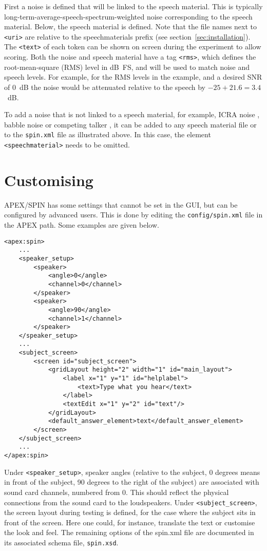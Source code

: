 {First a noise is defined that will be linked to the speech material.
This is typically long-term-average-speech-spectrum-weighted noise
corresponding to the speech material. Below, the speech material is
defined. Note that the file names next to \texttt{<uri>} are relative to
the speechmaterials prefix (see section~\ref{sec:installation}). The
\texttt{<text>} of each token can be shown on screen during the
experiment to allow scoring. Both the noise and speech material have a
tag \texttt{<rms>}, which defines the root-mean-square (RMS) level in
dB~FS, and will be used to match noise and speech levels. For example, for the
RMS levels in the example, and a desired SNR of 0~dB the noise would be
attenuated relative to the speech by $-25+21.6=3.4$~dB.

To add a noise that is not linked to a speech material, for example, ICRA noise
\citep{Dreschler}, babble noise or competing talker \citep{flucnoise},
it can be added to any speech material file or to the \texttt{spin.xml}
file as illustrated above. In this case, the element
\texttt{<speechmaterial>} needs to be omitted.

\section{Customising}
\label{sec:customising}

APEX/SPIN has some settings that cannot be set in the GUI, but can be
configured by advanced users. This is done by editing the
\texttt{config/spin.xml} file in the APEX path. Some examples are given
below.

\begin{lstlisting}[caption=Specifying speaker locations and a custom screen]
<apex:spin>
    ...
    <speaker_setup>
        <speaker> 
            <angle>0</angle>    
            <channel>0</channel>
        </speaker>
        <speaker>
            <angle>90</angle>
            <channel>1</channel>
        </speaker>
    </speaker_setup>
    ...
    <subject_screen>
        <screen id="subject_screen">
            <gridLayout height="2" width="1" id="main_layout">
                <label x="1" y="1" id="helplabel">
                    <text>Type what you hear</text>
                </label>
                <textEdit x="1" y="2" id="text"/>
            </gridLayout>
            <default_answer_element>text</default_answer_element>
        </screen>
    </subject_screen>
    ...
</apex:spin>
\end{lstlisting}

Under \texttt{<speaker\_setup>}, speaker angles (relative to the
subject, 0 degrees means in front of the subject, 90 degrees to the
right of the subject) are associated with sound card channels, numbered
from 0. This should reflect the physical connections from the sound card
to the loudspeakers. Under \texttt{<subject\_screen>}, the screen layout
during testing is defined, for the case where the subject sits in front
of the screen. Here one could, for instance, translate the text or
customise the look and feel. The remaining options of the spin.xml file
are documented in its associated schema file, \texttt{spin.xsd}.

}

